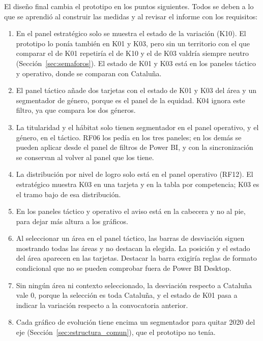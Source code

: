 \documentclass[12pt, a4paper, oneside]{report}
\begin{document}
El diseño final cambia el prototipo en los puntos siguientes. Todos se deben a lo que se aprendió al construir las medidas y al revisar el informe con los requisitos:
\begin{enumerate}
    \item En el panel estratégico solo se muestra el estado de la variación (K10). El prototipo lo ponía también en K01 y K03, pero sin un territorio con el que comparar el de K01 repetiría el de K10 y el de K03 valdría siempre neutro (Sección~\ref{sec:semaforos}). El estado de K01 y K03 está en los paneles táctico y operativo, donde se comparan con Cataluña.
    \item El panel táctico añade dos tarjetas con el estado de K01 y K03 del área y un segmentador de género, porque es el panel de la equidad. K04 ignora este filtro, ya que compara los dos géneros.
    \item La titularidad y el hábitat solo tienen segmentador en el panel operativo, y el género, en el táctico. RF06 los pedía en los tres paneles; en los demás se pueden aplicar desde el panel de filtros de Power BI, y con la sincronización se conservan al volver al panel que los tiene.
    \item La distribución por nivel de logro solo está en el panel operativo (RF12). El estratégico muestra K03 en una tarjeta y en la tabla por competencia; K03 es el tramo bajo de esa distribución.
    \item En los paneles táctico y operativo el aviso está en la cabecera y no al pie, para dejar más altura a los gráficos.
    \item Al seleccionar un área en el panel táctico, las barras de desviación siguen mostrando todas las áreas y no destacan la elegida. La posición y el estado del área aparecen en las tarjetas. Destacar la barra exigiría reglas de formato condicional que no se pueden comprobar fuera de Power BI Desktop.
    \item Sin ningún área ni contexto seleccionado, la desviación respecto a Cataluña vale 0, porque la selección es toda Cataluña, y el estado de K01 pasa a indicar la variación respecto a la convocatoria anterior.
    \item Cada gráfico de evolución tiene encima un segmentador para quitar 2020 del eje (Sección~\ref{sec:estructura_comun}), que el prototipo no tenía.
\end{enumerate}

\end{document}
